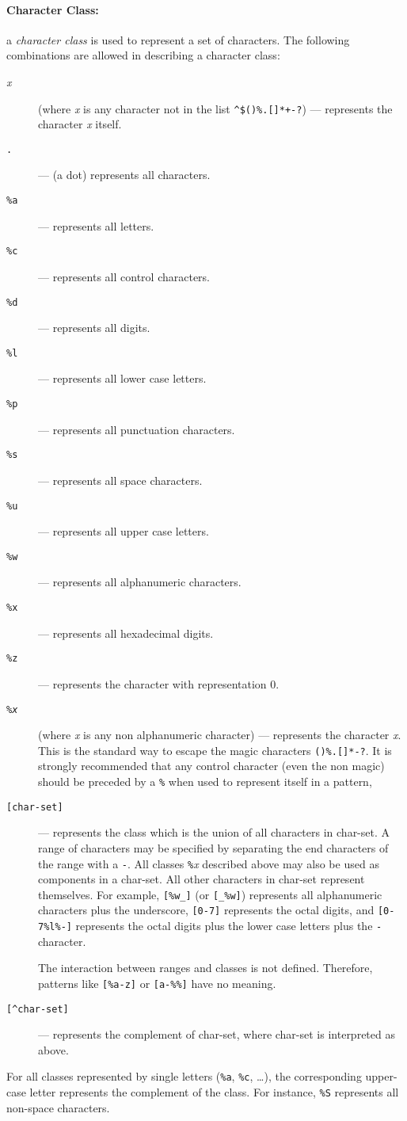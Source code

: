 \documentclass[11pt]{article}
\newcommand{\M}[1]{\rm\emph{#1}}
\newcommand{\T}[1]{{\tt #1}}
\newcommand{\Def}[1]{\emph{#1}\index{#1}}
\begin{document}
\paragraph{Character Class:}
a \Def{character class} is used to represent a set of characters.
The following combinations are allowed in describing a character class:
\begin{description}
\item[\emph{x}] (where \emph{x} is any character not in the list
\verb|^$()%.[]*+-?|)
--- represents the character \emph{x} itself.
\item[\T{.}] --- (a dot) represents all characters.
\item[\T{\%a}] --- represents all letters.
\item[\T{\%c}] --- represents all control characters.
\item[\T{\%d}] --- represents all digits.
\item[\T{\%l}] --- represents all lower case letters.
\item[\T{\%p}] --- represents all punctuation characters.
\item[\T{\%s}] --- represents all space characters.
\item[\T{\%u}] --- represents all upper case letters.
\item[\T{\%w}] --- represents all alphanumeric characters.
\item[\T{\%x}] --- represents all hexadecimal digits.
\item[\T{\%z}] --- represents the character with representation 0.
\item[\T{\%\M{x}}] (where \M{x} is any non alphanumeric character)  ---
represents the character \M{x}.
This is the standard way to escape the magic characters \verb|()%.[]*-?|.
It is strongly recommended that any control character (even the non magic)
should be preceded by a \verb|%|
when used to represent itself in a pattern,

\item[\T{[char-set]}] ---
represents the class which is the union of all
characters in char-set.
A range of characters may be specified by
separating the end characters of the range with a \verb|-|.
All classes \verb|%|\emph{x} described above may also be used as
components in a char-set.
All other characters in char-set represent themselves.
For example, \verb|[%w_]| (or \verb|[_%w]|)
represents all alphanumeric characters plus the underscore,
\verb|[0-7]| represents the octal digits,
and \verb|[0-7%l%-]| represents the octal digits plus
the lower case letters plus the \verb|-| character.

The interaction between ranges and classes is not defined.
Therefore, patterns like \verb|[%a-z]| or \verb|[a-%%]|
have no meaning.

\item[\T{[\^{ }char-set]}] ---
represents the complement of char-set,
where char-set is interpreted as above.
\end{description}
For all classes represented by single letters (\verb|%a|, \verb|%c|, \ldots),
the corresponding upper-case letter represents the complement of the class.
For instance, \verb|%S| represents all non-space characters.
\end{document}
